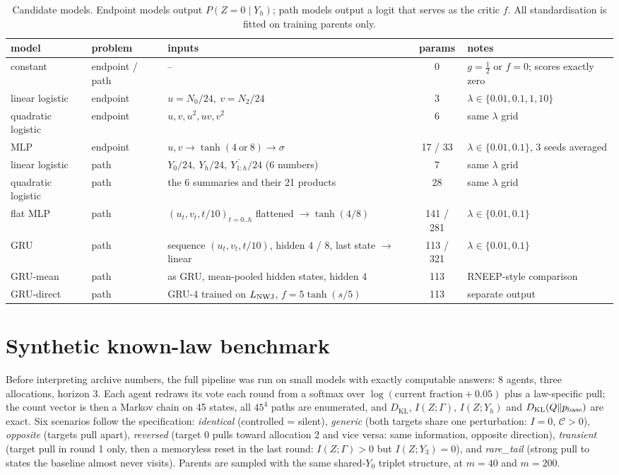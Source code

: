 \documentclass[10pt]{article}
\newcommand{\KL}{D_{\mathrm{KL}}}
\newcommand{\Cost}{\mathcal{C}}
\begin{document}
\begin{table}[htbp]
\centering
\footnotesize
\caption{Candidate models. Endpoint models output $P(Z=0\mid Y_h)$; path models output a logit that serves as the critic $f$. All standardisation is fitted on training parents only.}\label{tab:models}
\begin{tabular}{l l p{5.2cm} c p{3.6cm}}
\toprule
model & problem & inputs & params & notes \\
\midrule
constant & endpoint / path & -- & 0 & $g=\tfrac12$ or $f=0$; scores exactly zero \\
linear logistic & endpoint & $u=N_0/24,\ v=N_2/24$ & 3 & $\lambda\in\{0.01,0.1,1,10\}$ \\
quadratic logistic & endpoint & $u,v,u^2,uv,v^2$ & 6 & same $\lambda$ grid \\
MLP & endpoint & $u,v \to \tanh(4\ \text{or}\ 8) \to \sigma$ & 17 / 33 & $\lambda\in\{0.01,0.1\}$, 3 seeds averaged \\
linear logistic & path & $Y_0/24,\ Y_h/24,\ \overline{Y_{1:h}}/24$ (6 numbers) & 7 & same $\lambda$ grid \\
quadratic logistic & path & the 6 summaries and their 21 products & 28 & same $\lambda$ grid \\
flat MLP & path & $(u_t,v_t,t/10)_{t=0..h}$ flattened $\to \tanh(4/8)$ & 141 / 281 & $\lambda\in\{0.01,0.1\}$ \\
GRU & path & sequence $(u_t,v_t,t/10)$, hidden 4 / 8, last state $\to$ linear & 113 / 321 & $\lambda\in\{0.01,0.1\}$ \\
GRU-mean & path & as GRU, mean-pooled hidden states, hidden 4 & 113 & RNEEP-style comparison \\
GRU-direct & path & GRU-4 trained on $L_{\rm NWJ}$, $f = 5\tanh(s/5)$ & 113 & separate output \\
\bottomrule
\end{tabular}
\end{table}

\section{Synthetic known-law benchmark}
Before interpreting archive numbers, the full pipeline was run on small models with exactly computable answers: 8 agents, three allocations, horizon 3. Each agent redraws its vote each round from a softmax over $\log(\text{current fraction}+0.05)$ plus a law-specific pull; the count vector is then a Markov chain on 45 states, all $45^4$ paths are enumerated, and $\KL$, $I(Z;\Gamma)$, $I(Z;Y_h)$ and $\KL(Q\Vert p_{\rm base})$ are exact. Six scenarios follow the specification: \emph{identical} (controlled = silent), \emph{generic} (both targets share one perturbation: $I=0$, $\Cost>0$), \emph{opposite} (targets pull apart), \emph{reversed} (target 0 pulls toward allocation 2 and vice versa: same information, opposite direction), \emph{transient} (target pull in round 1 only, then a memoryless reset in the last round: $I(Z;\Gamma)>0$ but $I(Z;Y_3)=0$), and \emph{rare\_tail} (strong pull to states the baseline almost never visits). Parents are sampled with the same shared-$Y_0$ triplet structure, at $m=40$ and $m=200$.
\end{document}
